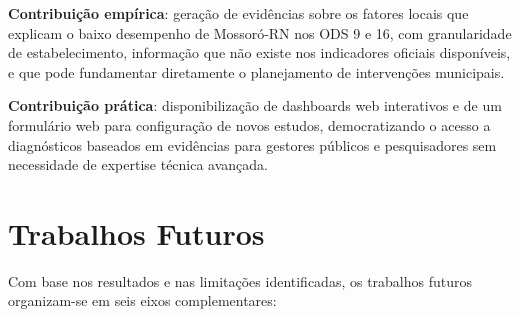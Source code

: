 \textbf{Contribuição empírica}: geração de evidências sobre os fatores locais que explicam o baixo desempenho de Mossoró-RN nos ODS 9 e 16, com granularidade de estabelecimento, informação que não existe nos indicadores oficiais disponíveis, e que pode fundamentar diretamente o planejamento de intervenções municipais.

\textbf{Contribuição prática}: disponibilização de dashboards web interativos e de um formulário web para configuração de novos estudos, democratizando o acesso a diagnósticos baseados em evidências para gestores públicos e pesquisadores sem necessidade de expertise técnica avançada.

\section{Trabalhos Futuros}
\label{sec:trabalhos-futuros}

Com base nos resultados e nas limitações identificadas, os trabalhos futuros organizam-se em seis eixos complementares:

